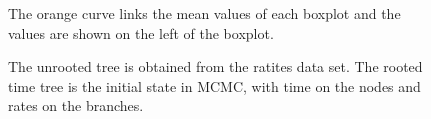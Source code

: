 \documentclass{bmcart}
\begin{document}
\begin{backmatter}
\begin{figure}[h!]
\centering
{}
\caption{
             The orange curve links the mean values of each boxplot and the values are shown on the left of the boxplot.}
\label{eff_comp2}
\end{figure}

\begin{figure}[h!]
\centering
{}
\caption{
            The unrooted tree is obtained from the ratites data set. The rooted time tree is the initial state in MCMC, with time on the nodes and rates on the branches.}
\label{withoutdata}
\end{figure}


\end{backmatter}
\end{document}
